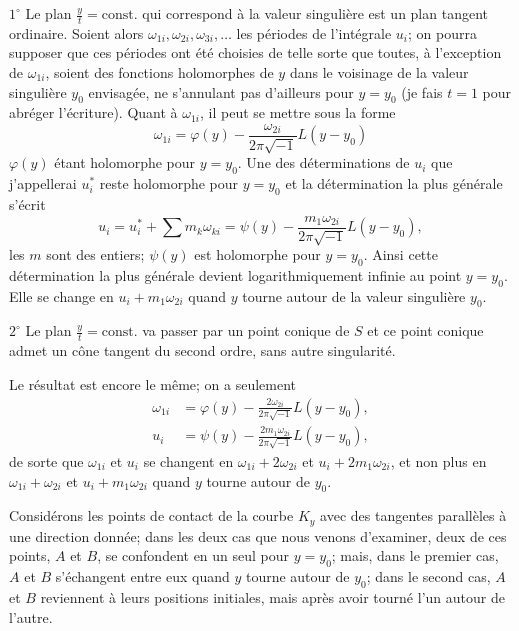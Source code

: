 \documentclass{article}
\begin{document}
$1^{\circ}$ Le plan $\frac{y}{t} = \text{const.}$ qui correspond à la valeur singulière est un plan tangent ordinaire. Soient alors $\omega_{1i}, \omega_{2i}, \omega_{3i}, \ldots$ les périodes de l'intégrale $u_{i}$; on pourra supposer que ces périodes ont été choisies de telle sorte que toutes, à l'exception de $\omega_{1i}$, soient des fonctions holomorphes de $y$ dans le voisinage de la valeur singulière $y_{0}$ envisagée, ne s'annulant pas d'ailleurs pour $y = y_{0}$ (je fais $t = 1$ pour abréger l'écriture). Quant à $\omega_{1i}$, il peut se mettre sous la forme
\[
\omega_{1i} = \varphi(y) - \frac{\omega_{2i}}{2\pi\sqrt{-1}} L(y - y_{0})
\]
$\varphi(y)$ étant holomorphe pour $y = y_{0}$. Une des déterminations de $u_{i}$ que j'appellerai $u_{i}^{*}$ reste holomorphe pour $y = y_{0}$ et la détermination la plus générale s'écrit
\[
u_{i} = u_{i}^{*} + \displaystyle\sum m_{k} \omega_{ki} = \psi(y) - \frac{m_{1}\omega_{2i}}{2\pi\sqrt{-1}} L(y - y_{0}),
\]
les $m$ sont des entiers; $\psi(y)$ est holomorphe pour $y = y_{0}$. Ainsi cette détermination la plus générale devient logarithmiquement infinie au point $y = y_{0}$. Elle se change en $u_{i} + m_{1} \omega_{2i}$ quand $y$ tourne autour de la valeur singulière $y_{0}$.

$2^{\circ}$ Le plan $\frac{y}{t} = \text{const.}$ va passer par un point conique de $S$ et ce point conique admet un cône tangent du second ordre, sans autre singularité.

Le résultat est encore le même; on a seulement
\[
\begin{aligned}
\omega_{1i} &= \varphi(y) - \frac{2\omega_{2i}}{2\pi\sqrt{-1}} L(y - y_{0}), \\
u_{i} &= \psi(y) - \frac{2m_{1}\omega_{2i}}{2\pi\sqrt{-1}} L(y - y_{0}),
\end{aligned}
\]
de sorte que $\omega_{1i}$ et $u_{i}$ se changent en $\omega_{1i} + 2\omega_{2i}$ et $u_{i} + 2m_{1} \omega_{2i}$, et non plus en $\omega_{1i} + \omega_{2i}$ et $u_{i} + m_{1} \omega_{2i}$ quand $y$ tourne autour de $y_{0}$.

Considérons les points de contact de la courbe $K_{y}$ avec des tangentes parallèles à une direction donnée; dans les deux cas que nous venons d'examiner, deux de ces points, $A$ et $B$, se confondent en un seul pour $y = y_{0}$; mais, dans le
premier cas, $A$ et $B$ s'échangent entre eux quand $y$ tourne autour de $y_{0}$; dans le second cas, $A$ et $B$ reviennent à leurs positions initiales, mais après avoir tourné l'un autour de l'autre.
\end{document}
